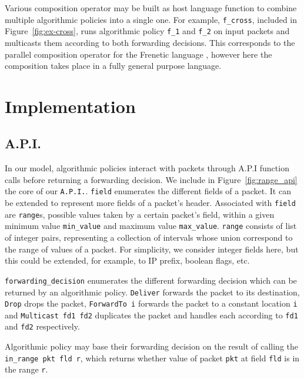 \documentclass[preprint]{sigplanconf}
\begin{document}
Various composition operator may be built as host language function to combine multiple algorithmic policies into a single one. For example, \lstinline|f_cross|, included in Figure~\ref{fig:ex-cross}, runs algorithmic policy \lstinline|f_1| and \lstinline|f_2| on input packets and multicasts them according to both forwarding decisions. This corresponds to the parallel composition operator for the Frenetic language \cite{Frenetic}, however here the composition takes place in a fully general purpose language.
   
\section*{Implementation}

\subsection*{A.P.I.}
In our model, algorithmic policies interact with packets through A.P.I function calls before returning a forwarding decision. We include in Figure~\ref{fig:range_api} the core of our \lstinline|A.P.I.|. 
\lstinline|field| enumerates the different fields of a packet. It can be extended to represent more fields of a packet's header. Associated with \lstinline|field| are \lstinline|range|s, possible values taken by a certain packet's field, within a given minimum value \lstinline|min_value| and maximum value \lstinline|max_value|. \lstinline|range| consists of list of integer pairs, representing a collection of intervals whose union correspond to the range of values of a packet. For simplicity, we consider integer fields here, but this could be extended, for example, to IP prefix, boolean flags, etc.

\lstinline|forwarding_decision| enumerates the different forwarding decision which can be returned by an algorithmic policy. \lstinline|Deliver| forwards the packet to its destination, \lstinline|Drop| drops the packet, \lstinline|ForwardTo i| forwards the packet to a constant location \lstinline|i| and \lstinline|Multicast fd1 fd2| duplicates the packet and handles each according to \lstinline|fd1| and \lstinline|fd2| respectively.

Algorithmic policy may base their forwarding decision on the result of calling the \lstinline|in_range pkt fld r|, which returns whether value of packet \lstinline|pkt| at field \lstinline|fld| is in the range \lstinline|r|.
\end{document}

